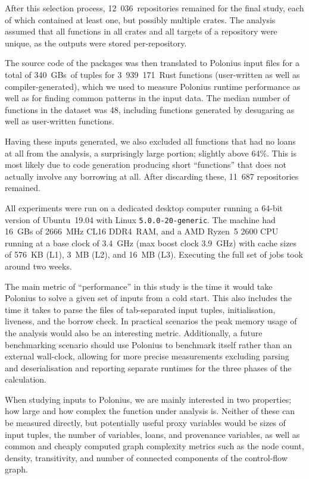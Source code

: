 \documentclass[11pt,a4paper,twoside,openany]{report}
\renewcommand\_{\textunderscore\allowbreak}
\begin{document}
After this selection process, 12~036~repositories remained for the final study,
each of which contained at least one, but possibly multiple crates. The analysis
assumed that all functions in all crates and all targets of a repository were
unique, as the outputs were stored per-repository.

The source code of the packages was then translated to Polonius input files for
a total of 340~GBs~of tuples for 3~939~171~Rust functions (user-written as well
as compiler-generated), which we used to measure Polonius runtime performance as
well as for finding common patterns in the input data. The median number of
functions in the dataset was 48, including functions generated by desugaring as
well as user-written functions.

Having these inputs generated, we also excluded all functions that had no loans
at all from the analysis, a surprisingly large portion; slightly above 64\%.
This is most likely due to code generation producing short ``functions'' that
does not actually involve any borrowing at all. After discarding these, 11~687
repositories remained.

All experiments were run on a dedicated desktop computer running a 64-bit
version of Ubuntu~19.04 with Linux \texttt{5.0.0-20-generic}. The machine had
16~GBs of 2666~MHz CL16 DDR4~RAM, and a AMD Ryzen~5 2600 CPU running at a base
clock of 3.4~GHz (max boost clock 3.9~GHz) with cache sizes of 576~KB (L1), 3~MB
(L2), and 16~MB (L3). Executing the full set of jobs took around two weeks.

The main metric of ``performance'' in this study is the time it would take
Polonius to solve a given set of inputs from a cold start. This also includes
the time it takes to parse the files of tab-separated input tuples,
initialisation, liveness, and the borrow check. In practical scenarios the peak
memory usage of the analysis would also be an interesting metric. Additionally,
a future benchmarking scenario should use Polonius to benchmark itself rather
than an external wall-clock, allowing for more precise measurements excluding
parsing and deserialisation and reporting separate runtimes for the three
phases of the calculation.

When studying inputs to Polonius, we are mainly interested in two properties;
how large and how complex the function under analysis is. Neither of these can
be measured directly, but potentially useful proxy variables would be sizes of
input tuples, the number of variables, loans, and provenance variables, as well
as common and cheaply computed graph complexity metrics such as the node count,
density, transitivity, and number of connected components of the control-flow
graph.
\end{document}
